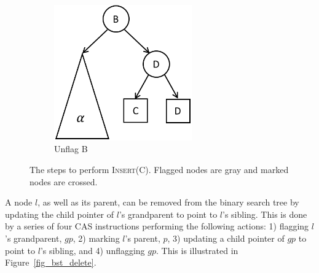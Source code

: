 \documentclass[letterpaper]{article}
\begin{document}
\begin{figure}[!bt]
\begin{subfigure}[b]{0.3\textwidth}
		\includegraphics[width=0.65\textwidth]{bst_ins_4.png} %
		\caption{Unflag B}
	\end{subfigure}
	\caption{The steps to perform \textsc{Insert}(C). Flagged nodes are gray and marked nodes are crossed.}\label{fig_bst_insert}
\end{figure}

A node $l$, as well as its parent, can be removed from the binary search tree by updating the child pointer of $l$'s grandparent to point to $l$'s sibling. This is done by a series of four CAS instructions performing the following actions: 1) flagging $l$'s grandparent, $gp$, 2) marking $l$'s parent, $p$, 3) updating a child pointer of $gp$ to point to $l$'s sibling, and 4) unflagging $gp$. This is illustrated in Figure~\ref{fig_bst_delete}.
\end{document}

